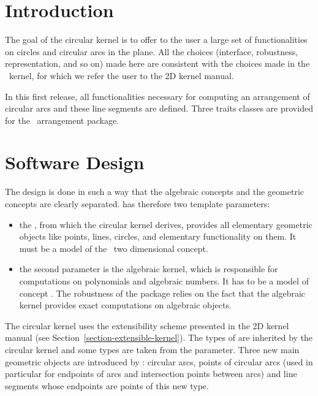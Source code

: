 \section{Introduction}

The goal of the circular kernel is to offer to the user a large set of
functionalities on circles and circular arcs in the plane. All the
choices (interface, robustness, representation, and so on) made here
are consistent with the choices made in the \cgal\ kernel, for which we
refer the user to the 2D kernel manual. 

In this first release, all functionalities necessary for computing an
arrangement of circular arcs and these line segments are
defined. Three traits classes are provided for the \cgal\ arrangement
package. 

\section{Software Design}

The design is done in such a way that the algebraic concepts and the
geometric concepts are clearly separated. 
has therefore two template parameters: 
\begin{itemize}
\item {} the , from which the circular kernel derives,
provides all elementary geometric objects like points, lines, circles, and
elementary functionality on them. It must be a model of the \cgal\ two 
dimensional  concept.
\item {} the second parameter is the algebraic kernel, which is 
responsible for computations on polynomials and algebraic numbers. It 
has to be a model of concept . The
robustness of the package relies on the fact that the algebraic kernel
provides exact computations on algebraic objects.
\end{itemize}

The circular kernel uses the extensibility scheme presented in the 2D
kernel manual (see Section~\ref{section-extensible-kernel}). 
The types of  are inherited
by the circular kernel and some types are taken from the
 parameter. Three new main geometric objects are
introduced by : circular arcs, points of
circular arcs (used in particular for endpoints of arcs and
intersection points between arcs) and line segments whose endpoints
are points of this new type.  

